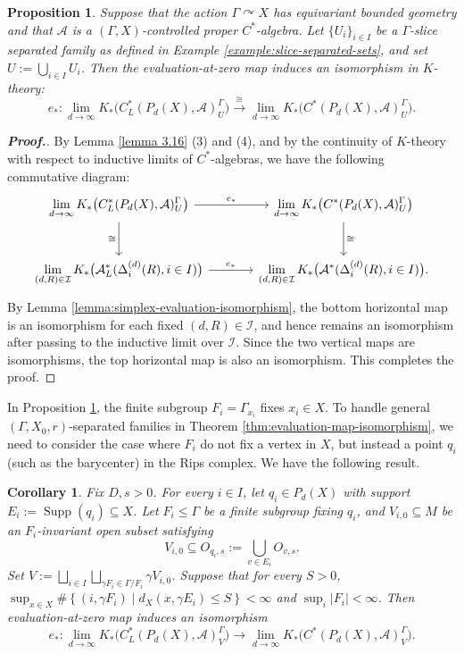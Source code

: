 \documentclass[pdflatex]{sn-jnl}
\theoremstyle{plain}
\newtheorem{corollary}[theorem]{Corollary}
\newtheorem{proposition}[theorem]{Proposition}
\theoremstyle{definition}
\begin{document}
\begin{proposition}\label{proposition:eval-slice-separated}
Suppose that the action $\Gamma\curvearrowright X$ has equivariant bounded
geometry and that $\mathcal{A}$ is a $(\Gamma,X)$-controlled proper
$C^{*}$-algebra. Let $\{U_i\}_{i\in I}$ be a $\Gamma$-slice
separated family as defined in
Example \ref{example:slice-separated-sets}, and set $U:=\bigcup_{i\in I}U_i$.
Then the evaluation-at-zero map induces an isomorphism in $K$-theory:
\[
e_{*}:\lim_{d\to\infty}K_{*}\bigl(C^{*}_{L}(P_{d}(X),\mathcal{A})^{\Gamma}_{U}\bigr)
\xrightarrow{\cong}
\lim_{d\to\infty}K_{*}\bigl(C^{*}(P_{d}(X),\mathcal{A})^{\Gamma}_{U}\bigr).
\]
\end{proposition}
\begin{proof}[\textbf{Proof.}]\normalsize
By Lemma \ref{lemma 3.16} (3) and (4), and by the continuity of $K$-theory with respect to inductive limits of $C^{*}$-algebras, we have the following commutative diagram:
\[
\begin{tikzcd}[row sep=large, column sep=large]
\displaystyle\lim_{d \to \infty } K_{*}\bigl(C^{*}_{L}(P_{d}(X),\mathcal{A})^{\Gamma}_{U}\bigr)
\arrow[r,"e_{*}"]
\arrow[d,"\cong"']
&
\displaystyle\lim_{d \to \infty } K_{*}\bigl(C^{*}(P_{d}(X),\mathcal{A})^{\Gamma}_{U}\bigr)
\arrow[d,"\cong"]
\\
\displaystyle\lim_{(d,R)\in\mathcal I}
K_{*}\bigl(\mathcal{A}^{*}_{L}(\Delta_i^{(d)}(R), i\in I)\bigr)
\arrow[r,"e_{*}"]
&
\displaystyle\lim_{(d,R)\in\mathcal I}
K_{*}\bigl(\mathcal{A}^{*}(\Delta_i^{(d)}(R), i\in I)\bigr).
\end{tikzcd}
\]
By Lemma \ref{lemma:simplex-evaluation-isomorphism}, the bottom horizontal map is an isomorphism for each fixed $(d,R)\in\mathcal I$, and hence remains an isomorphism after passing to the inductive limit over $\mathcal{I}$. Since the two vertical maps are isomorphisms, the top horizontal map is also an isomorphism. This completes the proof.
\end{proof}
In Proposition \ref{proposition:eval-slice-separated}, the finite subgroup $F_{i}=\Gamma_{x_i}$ fixes $x_{i}\in X$. To handle general $(\Gamma,X_0,r)$-separated families in Theorem \ref{thm:evaluation-map-isomorphism}, we need to consider the case where $F_i$ do not fix a vertex in $X$, but instead a point $q_i$ (such as the barycenter) in the Rips complex. We have the following result.
\begin{corollary}\label{prop:anchored-slice-evaluation}
Fix $D,s>0$. For every $i\in I$, let $q_i\in P_{d}(X)$ with support $E_i:=\operatorname{Supp}(q_i)\subseteq X$. Let
$F_i\leq\Gamma$ be a finite subgroup fixing $q_i$, and 
$V_{i,0}\subseteq M$ be an $F_i$-invariant open subset satisfying
\[V_{i,0}\subseteq O_{q_i,s}:=\bigcup_{v\in E_i}O_{v,s}.\]
Set
$V:=\bigsqcup_{i\in I}\bigsqcup_{\gamma F_i\in\Gamma/F_i}
\gamma V_{i,0}$.
Suppose that for every $S>0$,
$\sup_{x\in X}\#\left\{(i,\gamma F_i)\mid d_X(x,\gamma E_i)\leq S
\right\}<\infty$
and $\sup_i|F_i|<\infty$. Then evaluation-at-zero map
induces an isomorphism
\[e_{*}:\lim_{d\to\infty}
K_{*}\bigl(C_L^*(P_{d}(X),\mathcal{A})^\Gamma_V\bigr)
\longrightarrow
\lim_{d\to\infty}
K_{*}\bigl(C^*(P_{d}(X),\mathcal{A})^\Gamma_V\bigr).\]
\end{corollary}
\end{document}
